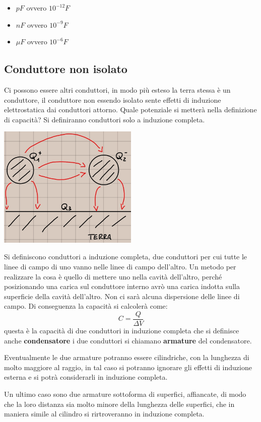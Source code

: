 \documentclass[a4paper, 12pt]{book}
\theoremstyle{plain}
\begin{document}
\begin{itemize}
    \item $pF$ ovvero $10^{-12}F$
    \item $nF$ ovvero $10^{-9}F$
    \item $\mu F$ ovvero $10^{-6}F$
\end{itemize}

\subsection{Conduttore non isolato}

Ci possono essere altri conduttori, in modo più esteso 
la terra stessa è un conduttore, il conduttore non essendo 
isolato sente effetti di induzione elettrostatica dai 
conduttori attorno. Quale potenziale si metterà nella 
definizione di capacità? Si definiranno conduttori solo 
a induzione completa.

\includegraphics[width=0.5\textwidth]{cond_terra.jpg}

Si definiscono conduttori a induzione completa, due conduttori 
per cui tutte le linee di campo di uno vanno nelle 
linee di campo dell'altro. Un metodo per realizzare 
la cosa è quello di mettere uno nella cavità 
dell'altro, perché posizionando una carica sul conduttore 
interno avrò una carica indotta sulla superficie della 
cavità dell'altro. Non ci sarà alcuna dispersione delle
linee di campo. Di conseguenza la capacità si calcolerà 
come: \[ C = \frac{Q}{\Delta V} \] questa è la capacità
di due conduttori in induzione completa che si definisce 
anche \textbf{condensatore} i due conduttori si chiamano
\textbf{armature} del condensatore. 

Eventualmente le 
due armature potranno essere cilindriche, con la lunghezza 
di molto maggiore al raggio, in tal caso si potranno ignorare 
gli effetti di induzione esterna e si potrà considerarli 
in induzione completa.

Un ultimo caso sono due armature 
sottoforma di superfici, affiancate, di modo che la loro 
distanza sia molto minore della lunghezza delle superfici, 
che in maniera simile al cilindro si rirtroveranno in 
induzione completa.
\end{document}
